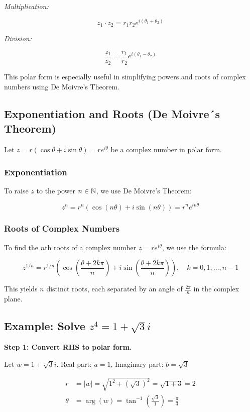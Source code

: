 \emph{Multiplication:}

\[
	z_1 \cdot z_2 = r_1 r_2 e^{i(\theta_1 + \theta_2)}
\]

\emph{Division:}
	      
\[
	\frac{z_1}{z_2} = \frac{r_1}{r_2} e^{i(\theta_1 - \theta_2)}
\]

This polar form is especially useful in simplifying powers and roots of complex numbers using De Moivre’s Theorem.

\subsection{Exponentiation and Roots (De Moivre´s Theorem)}

Let \( z = r(\cos \theta + i \sin \theta) = re^{i\theta} \) be a complex number in polar form.

\subsubsection{Exponentiation}

To raise \( z \) to the power \( n \in \mathbb{N} \), we use De Moivre’s Theorem:

\[
	z^n = r^n (\cos(n\theta) + i \sin(n\theta)) = r^n e^{in\theta}
\]

\subsubsection{Roots of Complex Numbers}

To find the \( n \)th roots of a complex number \( z = r e^{i\theta} \), we use the formula:

\[
	z^{1/n} = r^{1/n} \left( \cos\left( \frac{\theta + 2k\pi}{n} \right) + i \sin\left( \frac{\theta + 2k\pi}{n} \right) \right), \quad k = 0, 1, \ldots, n-1
\]

This yields \( n \) distinct roots, each separated by an angle of \( \frac{2\pi}{n} \) in 
the complex plane.

\subsection{Example: Solve \texorpdfstring{\( z^4 = 1 + \sqrt{3}i \)}{}}

\textbf{Step 1: Convert RHS to polar form.}

Let \( w = 1 + \sqrt{3}i \). Real part: \( a = 1 \), Imaginary part: \( b = \sqrt{3} \)

\begin{align*}
	r      & = |w| = \sqrt{1^2 + {(\sqrt{3})}^2} = \sqrt{1 + 3} = 2                    \\
	\theta & = \arg(w) = \tan^{-1} \left( \frac{\sqrt{3}}{1} \right) = \frac{\pi}{3}
\end{align*}

